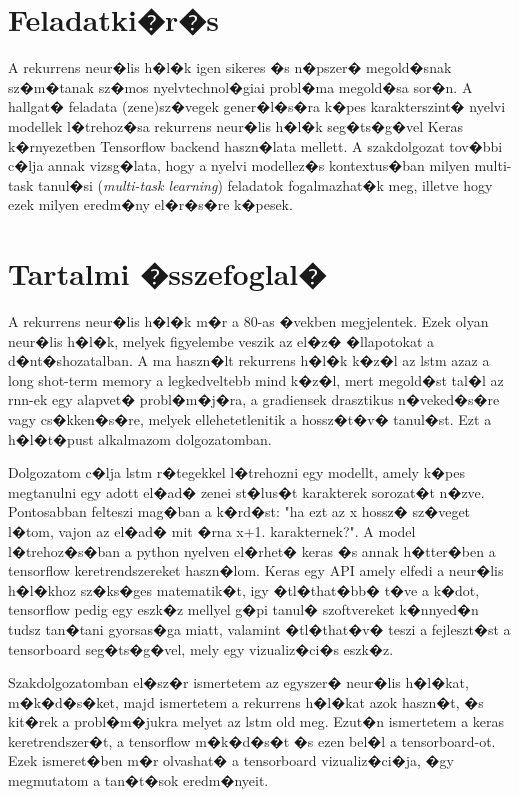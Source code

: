 \documentclass[12pt]{report}
\theoremstyle{definition}
\begin{document}
\chapter*{Feladatki�r�s}

A rekurrens neur�lis h�l�k igen sikeres �s n�pszer� megold�snak sz�m�tanak 
sz�mos nyelvtechnol�giai probl�ma megold�sa sor�n. A hallgat� feladata 
(zene)sz�vegek gener�l�s�ra k�pes karakterszint� nyelvi modellek l�trehoz�sa 
rekurrens neur�lis h�l�k seg�ts�g�vel Keras k�rnyezetben Tensorflow backend 
haszn�lata mellett. A szakdolgozat tov�bbi c�lja annak vizsg�lata, hogy a 
nyelvi modellez�s kontextus�ban milyen multi-task tanul�si (\textit{multi-task 
learning}) feladatok fogalmazhat�k meg, illetve hogy ezek milyen eredm�ny 
el�r�s�re k�pesek.

\chapter*{Tartalmi �sszefoglal�}

A rekurrens neur�lis h�l�k m�r a 80-as �vekben megjelentek. Ezek olyan neur�lis 
h�l�k,
 melyek figyelembe veszik az el�z� �llapotokat a d�nt�shozatalban. A ma 
 haszn�lt rekurrens h�l�k k�z�l az lstm azaz a
long shot-term memory a legkedveltebb mind k�z�l, mert megold�st tal�l az 
rnn-ek egy alapvet� probl�m�j�ra,
a gradiensek drasztikus n�veked�s�re vagy cs�kken�s�re, melyek ellehetetlenitik 
a hossz�t�v� tanul�st. Ezt a h�l�t�pust alkalmazom dolgozatomban.

Dolgozatom c�lja lstm r�tegekkel l�trehozni egy modellt, amely k�pes megtanulni 
egy adott el�ad� zenei st�lus�t karakterek sorozat�t n�zve.
Pontosabban felteszi mag�ban a k�rd�st: "ha ezt az x hossz� sz�veget l�tom, 
vajon az el�ad� mit �rna x+1. karakternek?".
A model l�trehoz�s�ban a python nyelven el�rhet� keras �s annak h�tter�ben a tensorflow keretrendszereket haszn�lom.
Keras egy API amely elfedi a neur�lis h�l�khoz sz�ks�ges matematik�t, igy �tl�that�bb� t�ve a k�dot, tensorflow pedig
egy eszk�z mellyel g�pi tanul� szoftvereket k�nnyed�n tudsz tan�tani gyorsas�ga 
miatt, valamint
�tl�that�v� teszi a fejleszt�st a tensorboard seg�ts�g�vel, mely egy 
vizualiz�ci�s eszk�z.

Szakdolgozatomban el�sz�r ismertetem az egyszer� neur�lis h�l�kat, m�k�d�s�ket,
majd ismertetem a rekurrens h�l�kat azok haszn�t, �s kit�rek a probl�m�jukra melyet az lstm old meg.
Ezut�n ismertetem a keras keretrendszer�t, a tensorflow m�k�d�s�t �s ezen bel�l a tensorboard-ot.
Ezek ismeret�ben m�r olvashat� a tensorboard vizualiz�ci�ja, �gy megmutatom a 
tan�t�sok eredm�nyeit.
\end{document}
